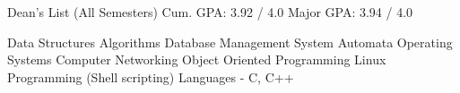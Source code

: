 Dean's List (All Semesters) \textbullet{}
Cum. GPA: 3.92 / 4.0 \textbullet{}
Major GPA: 3.94 / 4.0


Data Structures \textbullet{} Algorithms \textbullet{} Database Management System \textbullet{} Automata \textbullet{} Operating Systems \textbullet{} Computer Networking \textbullet{} Object Oriented Programming \textbullet{} Linux Programming (Shell scripting) \textbullet{} Languages - C, C++